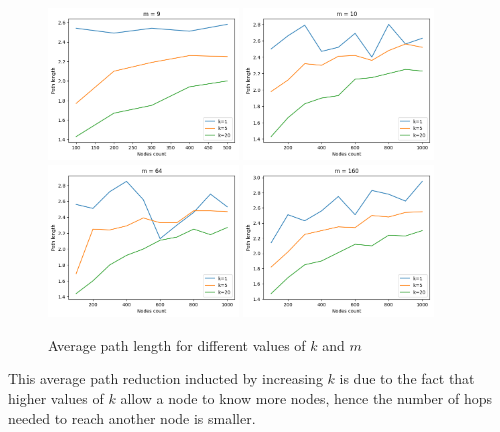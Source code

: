\documentclass[12pt]{article}
\begin{document}
\begin{figure}[H]
    \centering
    \includegraphics[width=0.45\textwidth]{assets/pathlength_m9.png}
    \includegraphics[width=0.45\textwidth]{assets/pathlength_m10.png}
    \includegraphics[width=0.45\textwidth]{assets/pathlength_m64.png}
    \includegraphics[width=0.45\textwidth]{assets/pathlength_m160.png}
    \caption{Average path length for different values of $k$ and $m$}
    \label{fig:avg_pathlength}
\end{figure}

\noindent
This average path reduction inducted by increasing $k$ is due to the fact that higher values of $k$ allow a node to know more
nodes, hence the number of hops needed to reach another node is smaller. \\
\end{document}
